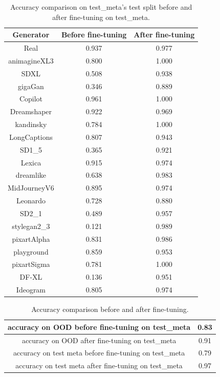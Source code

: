 \documentclass[12pt,a4paper]{article}
\begin{document}
\begin{table}[H]
\centering
    \begin{tabular}{|c|c|c|}
        \hline
        Generator & Before fine-tuning & After fine-tuning\\
        \hline
        Real & 0.937 & 0.977 \\
        \hline
        animagineXL3 & 0.800 & 1.000 \\
        \hline
        SDXL & 0.508 & 0.938 \\
        \hline
        gigaGan & 0.346 & 0.889 \\
        \hline
        Copilot & 0.961 & 1.000 \\
        \hline
        Dreamshaper & 0.922 & 0.969 \\
        \hline
        kandinsky & 0.784 & 1.000 \\
        \hline
        LongCaptions & 0.807 & 0.943 \\
        \hline
        SD1\_5 & 0.365 & 0.921 \\
        \hline
        Lexica & 0.915 & 0.974 \\
        \hline
        dreamlike & 0.638 & 0.983 \\
        \hline
        MidJourneyV6 & 0.895 & 0.974 \\
        \hline
        Leonardo & 0.728 & 0.880 \\
        \hline
        SD2\_1 & 0.489 & 0.957 \\
        \hline
        stylegan2\_3 & 0.121 & 0.989 \\
        \hline
        pixartAlpha & 0.831 & 0.986 \\
        \hline
        playground & 0.859 & 0.953 \\
        \hline
        pixartSigma & 0.781 & 1.000 \\
        \hline
        DF-XL & 0.136 & 0.951 \\
        \hline
        Ideogram & 0.805 & 0.974 \\
        \hline
    \end{tabular}
    \caption{Accuracy comparison on test\_meta's test split before and after fine-tuning on test\_meta.}
\end{table}

\begin{table}[H]
    \centering
    \begin{tabular}{|c|c|}
        \hline
        accuracy on OOD before fine-tuning on test\_meta & 0.83 \\
        \hline
        accuracy on OOD after fine-tuning on test\_meta & 0.91 \\
        \hline
        accuracy on test meta before fine-tuning on test\_meta & 0.79 \\
        \hline
        accuracy on test meta after fine-tuning on test\_meta & 0.97 \\
        \hline
    \end{tabular}
    \caption{Accuracy comparison before and after fine-tuning.}
    \label{tab:fine-tuning}
\end{table}
\end{document}
